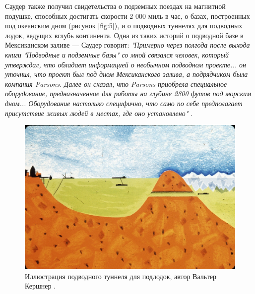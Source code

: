 \documentclass[10pt,twocolumn,letterpaper]{article}
\begin{document}
Саудер также получил свидетельства о подземных поездах на магнитной подушке, способных достигать скорости 2 000 миль в час, о базах, построенных под океанским дном (рисунок \ref{fig:5}), и о подводных туннелях для подводных лодок, ведущих вглубь континента. Одна из таких историй о подводной базе в Мексиканском заливе — Саудер говорит: \textit{"Примерно через полгода после выхода книги "Подводные и подземные базы" со мной связался человек, который утверждал, что обладает информацией о необычном подводном проекте... он уточнил, что проект был под дном Мексиканского залива, а подрядчиком была компания Parsons. Далее он сказал, что Parsons приобрела специальное оборудование, предназначенное для работы на глубине 2800 футов под морским дном... Оборудование настолько специфично, что само по себе предполагает присутствие живых людей в местах, где оно установлено"} \cite{22}.
\begin{figure}[t]
\begin{center}
   \includegraphics[width=1\linewidth]{sub.jpg}
\end{center}
   \caption{Иллюстрация подводного туннеля для подлодок, автор Вальтер Кершнер \cite{22,23}.}
\label{fig:6}
\label{fig:onecol}
\end{figure}
\end{document}
